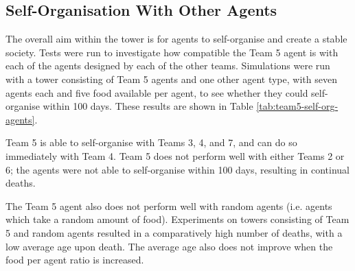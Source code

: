 


\subsection*{Self-Organisation With Other Agents}
The overall aim within the tower is for agents to self-organise and create a stable society. Tests were run to investigate how compatible the Team 5 agent is with each of the agents designed by each of the other teams. Simulations were run with a tower consisting of Team 5 agents and one other agent type, with seven agents each and five food available per agent, to see whether they could self-organise within 100 days. These results are shown in Table \ref{tab:team5-self-org-agents}.

Team 5 is able to self-organise with Teams 3, 4, and 7, and can do so immediately with Team 4. Team 5 does not perform well with either Teams 2 or 6; the agents were not able to self-organise within 100 days, resulting in continual deaths.

The Team 5 agent also does not perform well with random agents (i.e. agents which take a random amount of food). Experiments on towers consisting of Team 5 and random agents resulted in a comparatively high number of deaths, with a low average age upon death. The average age also does not improve when the food per agent ratio is increased.

